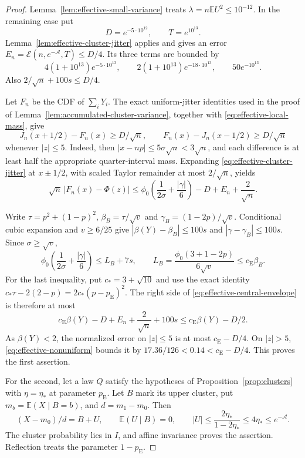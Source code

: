 \documentclass[aop]{imsart}
\theoremstyle{plain}
\theoremstyle{definition}
\theoremstyle{definition}
\newcommand{\EE}{\mathbb E}
\newcommand{\ce}{c_{\mathrm E}}
\newcommand{\pe}{p_{\mathrm E}}
\begin{document}
\begin{proof}
Lemma~\ref{lem:effective-small-variance} treats
$\lambda=n\EE U^2\le10^{-12}$.  In the remaining case put
\[
 D=e^{-5\cdot10^{12}},\qquad T=e^{10^{13}}.
\]
Lemma~\ref{lem:effective-cluster-jitter} applies and gives an error
$E_n=\mathcal E(n,e^{-\mathcal A},T)\le D/4$.
Its three terms are bounded by
\[
 4(1+10^{13})e^{-5\cdot10^{13}},\qquad
 2(1+10^{13})e^{-18\cdot10^{13}},\qquad
 50e^{-10^{13}}.
\]
Also $2/\sqrt n+100s\le D/4$.

Let $F_n$ be the CDF of $\sum_iY_i$.
The exact uniform-jitter identities used in the proof of
Lemma~\ref{lem:accumulated-cluster-variance}, together with
\eqref{eq:effective-local-mass}, give
\[
 J_n(x+1/2)-F_n(x)\ge D/\sqrt n,\qquad
 F_n(x)-J_n(x-1/2)\ge D/\sqrt n
\]
whenever $|z|\le5$.
Indeed, then $|x-np|\le5\sigma\sqrt n<3\sqrt n$, and each
difference is at least half the appropriate quarter-interval mass.
Expanding \eqref{eq:effective-cluster-jitter} at $x\pm1/2$,
with scaled Taylor remainder at most $2/\sqrt n$, yields
\begin{equation}\label{eq:effective-central-envelope}
 \sqrt n\,|F_n(x)-\Phi(z)|
 \le\phi_0\left(\frac1{2\sigma}+\frac{|\gamma|}{6}\right)
       -D+E_n+\frac2{\sqrt n}.
\end{equation}

Write $\tau=p^2+(1-p)^2$,
$\beta_B=\tau/\sqrt v$ and $\gamma_B=(1-2p)/\sqrt v$.
Conditional cubic expansion and $v\ge6/25$ give
$|\beta(Y)-\beta_B|\le100s$ and $|\gamma-\gamma_B|\le100s$.
Since $\sigma\ge\sqrt v$,
\[
 \phi_0\left(\frac1{2\sigma}+\frac{|\gamma|}{6}\right)
 \le L_B+7s,\qquad
 L_B=\frac{\phi_0(3+1-2p)}{6\sqrt v}\le\ce\beta_B.
\]
For the last inequality, put $c_*=3+\sqrt{10}$ and use the exact identity
$c_*\tau-2(2-p)=2c_*(p-\pe)^2$.
The right side of \eqref{eq:effective-central-envelope} is therefore
at most
\[
 \ce\beta(Y)-D+E_n+\frac2{\sqrt n}+100s
 \le\ce\beta(Y)-D/2.
\]
As $\beta(Y)<2$, the normalized error on $|z|\le5$ is at most
$\ce-D/4$.  On $|z|>5$, \eqref{eq:effective-nonuniform} bounds it
by $17.36/126<0.14<\ce-D/4$.  This proves the first assertion.

For the second, let a law $Q$ satisfy the hypotheses of
Proposition~\ref{prop:clusters} with $\eta=\eta_*$ at parameter $\pe$.
Let $B$ mark its upper cluster, put $m_b=\EE(X\mid B=b)$, and
$d=m_1-m_0$.  Then
\[
 (X-m_0)/d=B+U,\qquad
 \EE(U\mid B)=0,\qquad
 |U|\le\frac{2\eta_*}{1-2\eta_*}\le4\eta_*\le e^{-\mathcal A}.
\]
The cluster probability lies in $I$, and affine invariance proves
the assertion.  Reflection treats the parameter $1-\pe$.
\end{proof}
\end{document}
